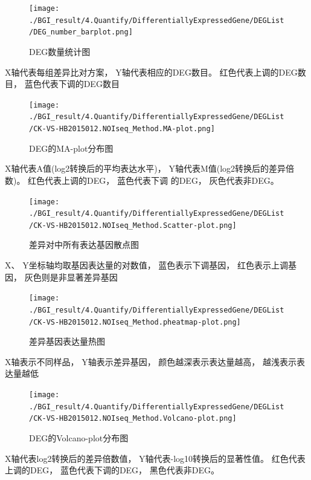 \documentclass[10pt, oneside,a4paper]{article}
\begin{document}
\begin{figure}[H]
\centering
\texttt{[image: ./BGI\_result/4.Quantify/DifferentiallyExpressedGene/DEGList/DEG\_number\_barplot.png]}
\par
\renewcommand{\figurename}{图}
\caption{DEG数量统计图}
\label{degstat}
\end{figure}
\begin{center}
X轴代表每组差异比对方案， Y轴代表相应的DEG数目。 红色代表上调的DEG数目， 蓝色代表下调的DEG数目
\end{center}

\begin{figure}[H]
\centering
\texttt{[image: ./BGI\_result/4.Quantify/DifferentiallyExpressedGene/DEGList/CK-VS-HB2015012.NOIseq\_Method.MA-plot.png]}
\par
\renewcommand{\figurename}{图}
\caption{DEG的MA-plot分布图}
\label{ma}
\end{figure}
\begin{center}
X轴代表A值(log2转换后的平均表达水平)， Y轴代表M值(log2转换后的差异倍数)。 红色代表上调的DEG， 蓝色代表下调
的DEG， 灰色代表非DEG。
\end{center}

\begin{figure}[H]
\centering
\texttt{[image: ./BGI\_result/4.Quantify/DifferentiallyExpressedGene/DEGList/CK-VS-HB2015012.NOIseq\_Method.Scatter-plot.png]}
\par
\renewcommand{\figurename}{图}
\caption{差异对中所有表达基因散点图}
\label{sca}
\end{figure}
\begin{center}
X、 Y坐标轴均取基因表达量的对数值， 蓝色表示下调基因， 红色表示上调基因， 灰色则是非显著差异基因
\end{center}

\begin{figure}[H]
\centering
\texttt{[image: ./BGI\_result/4.Quantify/DifferentiallyExpressedGene/DEGList/CK-VS-HB2015012.NOIseq\_Method.pheatmap-plot.png]}
\par
\renewcommand{\figurename}{图}
\caption{差异基因表达量热图}
\label{heatmap}
\end{figure}
\begin{center}
X轴表示不同样品， Y轴表示差异基因， 颜色越深表示表达量越高， 越浅表示表达量越低
\end{center}

\begin{figure}[H]
\centering
\texttt{[image: ./BGI\_result/4.Quantify/DifferentiallyExpressedGene/DEGList/CK-VS-HB2015012.NOIseq\_Method.Volcano-plot.png]}
\par
\renewcommand{\figurename}{图}
\caption{DEG的Volcano-plot分布图}
\label{vol}
\end{figure}
\begin{center}
X轴代表log2转换后的差异倍数值， Y轴代表-log10转换后的显著性值。 红色代表上调的DEG， 蓝色代表下调的DEG，
黑色代表非DEG。
\end{center}
\end{document}
